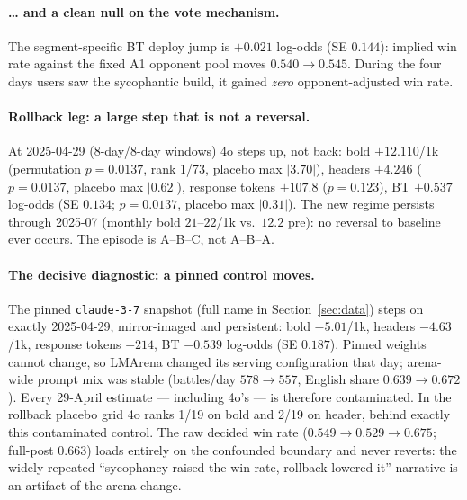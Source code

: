 \documentclass[11pt]{article}
\begin{document}
\paragraph{\ldots{} and a clean null on the vote mechanism.} The
segment-specific BT deploy jump is $+0.021$ log-odds (SE $0.144$): implied
win rate against the fixed A1 opponent pool moves $0.540 \to 0.545$. During
the four days users saw the sycophantic build, it gained \emph{zero}
opponent-adjusted win rate.

\paragraph{Rollback leg: a large step that is not a reversal.} At 2025-04-29
(8-day/8-day windows) 4o steps up, not back: bold $+12.110$/1k (permutation
$p=0.0137$, rank 1/73, placebo max $|3.70|$), headers $+4.246$ ($p=0.0137$,
placebo max $|0.62|$), response tokens $+107.8$ ($p=0.123$), BT $+0.537$
log-odds (SE $0.134$; $p=0.0137$, placebo max $|0.31|$). The new regime
persists through 2025-07 (monthly bold $21$--$22$/1k vs.\ $12.2$ pre): no
reversal to baseline ever occurs. The episode is A--B--C, not A--B--A.

\paragraph{The decisive diagnostic: a pinned control moves.} The pinned
\texttt{claude-3-7} snapshot (full name in Section~\ref{sec:data}) steps on
exactly 2025-04-29,
mirror-imaged and persistent: bold $-5.01$/1k, headers $-4.63$/1k, response
tokens $-214$, BT $-0.539$ log-odds (SE $0.187$). Pinned weights cannot
change, so LMArena changed its serving configuration that day; arena-wide
prompt mix was stable (battles/day $578 \to 557$, English share
$0.639 \to 0.672$). Every 29-April estimate --- including 4o's --- is
therefore contaminated. In the rollback placebo grid 4o ranks 1/19 on bold
and 2/19 on header, behind exactly this contaminated control. The raw decided
win rate ($0.549 \to 0.529 \to 0.675$; full-post $0.663$) loads entirely on
the confounded boundary and never reverts: the widely repeated
``sycophancy raised the win rate, rollback lowered it'' narrative is an
artifact of the arena change.
\end{document}
